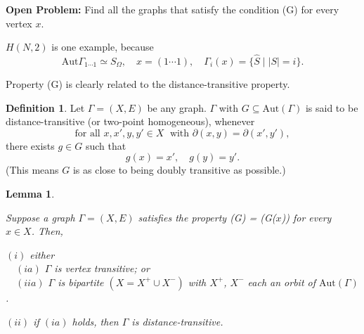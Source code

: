 \documentclass[
]{book}
\newtheorem{lemma}{Lemma}[chapter]
\theoremstyle{definition}
\newtheorem{definition}{Definition}[chapter]
\theoremstyle{definition}
\theoremstyle{definition}
\theoremstyle{definition}
\theoremstyle{remark}
\begin{document}
\textbf{Open Problem:}
Find all the graphs that satisfy the condition (G) for every vertex \(x\).

\(H(N, 2)\) is one example, because
\[\mathrm{Aut}\Gamma_{1\cdots 1} \simeq S_\Omega, \quad x = (1\cdots 1), \quad \Gamma_i(x) = \{\hat{S} \mid |S| = i\}.\]

Property (G) is clearly related to the distance-transitive property.

\begin{definition}
Let \(\Gamma = (X, E)\) be any graph. \(\Gamma\) with \(G\subseteq \mathrm{Aut}(\Gamma)\) is said to be distance-transitive  (or two-point homogeneous), whenever
\[\text{for all } x, x', y, y'\in X \; \text{ with } \partial(x,y) = \partial(x',y'),\]
there exists \(g\in G\) such that
\[g(x) = x',\quad g(y) = y'.\]
(This means \(G\) is as close to being doubly transitive as possible.)
\end{definition}

\begin{lemma}
\protect\hypertarget{lem:property-g}{}\label{lem:property-g}

Suppose a graph \(\Gamma = (X, E)\) satisfies the property \textrm{(G) = (G($x$))} for every \(x\in X\). Then,

\((i)\) either\\
\(\quad (ia)\) \(\Gamma\) is vertex transitive; or\\
\(\quad (iia)\) \(\Gamma\) is bipartite \((X = X^+ \cup X^-)\) with \(X^+\), \(X^-\) each an orbit of \(\mathrm{Aut}(\Gamma)\).

\((ii)\) if \((ia)\) holds, then \(\Gamma\) is distance-transitive.

\end{lemma}
\end{document}
